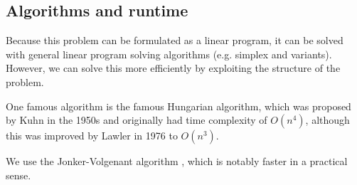 \documentclass[../tech_report_1.tex]{subfiles}
\begin{document}
\subsection{Algorithms and runtime}

Because this problem can be formulated as a linear program, it can be solved with general linear program solving algorithms (e.g. simplex and variants). However, we can solve this more efficiently by exploiting the structure of the problem.

One famous algorithm is the famous Hungarian algorithm, which was proposed by Kuhn in the 1950s and originally had time complexity of $O(n^4)$, although this was improved by Lawler in 1976 to $O(n^3)$.

We use the Jonker-Volgenant algorithm \cite{jonker1987shortest} \cite{lapjv}, which is notably faster in a practical sense.
\end{document}
